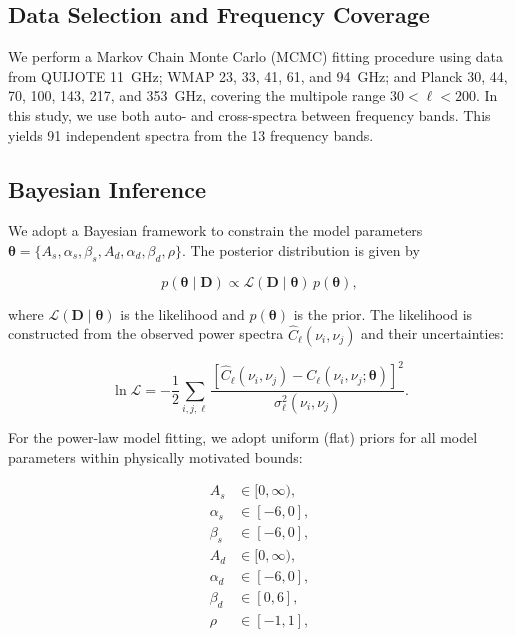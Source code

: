 \subsection{Data Selection and Frequency Coverage}

We perform a Markov Chain Monte Carlo (MCMC) fitting procedure using data from QUIJOTE 11~GHz; WMAP 23, 33, 41, 61, and 94~GHz; and Planck 30, 44, 70, 100, 143, 217, and 353~GHz, covering the multipole range $30 < \ell < 200$. In this study, we use both auto- and cross-spectra between frequency bands. This yields 91 independent spectra from the 13 frequency bands.

\subsection{Bayesian Inference}

We adopt a Bayesian framework to constrain the model parameters $\boldsymbol{\theta} = \{A_s, \alpha_s, \beta_s, A_d, \alpha_d, \beta_d, \rho\}$. The posterior distribution is given by

\begin{equation}
p(\boldsymbol{\theta} \mid \mathbf{D}) \propto \mathcal{L}(\mathbf{D} \mid \boldsymbol{\theta}) \, p(\boldsymbol{\theta}),
\end{equation}

where $\mathcal{L}(\mathbf{D} \mid \boldsymbol{\theta})$ is the likelihood and $p(\boldsymbol{\theta})$ is the prior. The likelihood is constructed from the observed power spectra $\hat{C}_\ell(\nu_i, \nu_j)$ and their uncertainties:

\begin{equation}
\ln \mathcal{L} = -\frac{1}{2} \sum_{i,j,\ell} \frac{[\hat{C}_\ell(\nu_i, \nu_j) - C_\ell(\nu_i, \nu_j; \boldsymbol{\theta})]^2}{\sigma^2_\ell(\nu_i, \nu_j)}.
\end{equation}

For the power-law model fitting, we adopt uniform (flat) priors for all model parameters within physically motivated bounds:

\begin{align}
    A_s &\in [0, \infty), \\
    \alpha_s &\in [-6, 0], \\
    \beta_s &\in [-6, 0], \\
    A_d &\in [0, \infty), \\
    \alpha_d &\in [-6, 0], \\
    \beta_d &\in [0, 6], \\
    \rho &\in [-1, 1],
\end{align}

